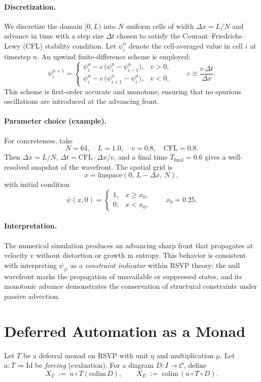 \documentclass[12pt]{article}
\theoremstyle{remark}
\begin{document}
\paragraph{Discretization.}
We discretize the domain $[0,L)$ into $N$ uniform cells of width $\Delta x = L/N$ 
and advance in time with a step size $\Delta t$ chosen to satisfy the Courant–Friedrichs–Lewy (CFL) stability condition. 
Let $\psi_i^n$ denote the cell-averaged value in cell $i$ at timestep $n$. 
An upwind finite-difference scheme is employed:
\[
\psi_i^{n+1} =
\begin{cases}
\psi_i^n - c\,\big(\psi_i^n - \psi_{i-1}^n\big), & v > 0, \\[6pt]
\psi_i^n - c\,\big(\psi_{i+1}^n - \psi_i^n\big), & v < 0,
\end{cases}
\qquad
c \equiv \dfrac{v\,\Delta t}{\Delta x}.
\]
This scheme is first-order accurate and monotone, ensuring that no spurious oscillations are introduced at the advancing front.

\paragraph{Parameter choice (example).}
For concreteness, take
\[
N = 64,\quad L=1.0,\quad v=0.8,\quad \mathrm{CFL}=0.8.
\]
Then $\Delta x = L/N$, $\Delta t = \mathrm{CFL} \cdot \Delta x / v$, 
and a final time $T_{\mathrm{final}}=0.6$ gives a well-resolved snapshot of the wavefront.
The spatial grid is
\[
x = \mathrm{linspace}(0,\, L-\Delta x,\, N),
\]
with initial condition
\[
\psi(x,0) = 
\begin{cases}
1, & x \geq x_0,\\
0, & x < x_0,
\end{cases}
\qquad x_0 = 0.25.
\]

\paragraph{Interpretation.}
The numerical simulation produces an advancing sharp front that propagates at velocity $v$ without distortion or growth in entropy. 
This behavior is consistent with interpreting $\psi_{\varnothing}$ as a \emph{constraint indicator} within RSVP theory: 
the null wavefront marks the propagation of unavailable or suppressed states, and its monotonic advance 
demonstrates the conservation of structural constraints under passive advection.


\section{Deferred Automation as a Monad}
\label{app:deferral}
Let $T$ be a deferral monad on RSVP with unit $\eta$ and multiplication $\mu$.
Let $a:T\Rightarrow \mathrm{Id}$ be \emph{forcing} (evaluation).
For a diagram $D:I\to \mathcal{C}$, define
\[
X_T \;:=\; a\circ T(\mathrm{colim}\, D), \qquad
X_E \;:=\; \mathrm{colim}\,(a\circ T\circ D).
\]
\end{document}
